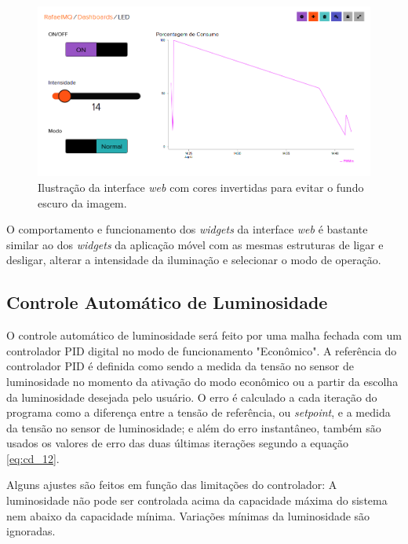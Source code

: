 \begin{figure}[ht]
    \begin{center}
    \includegraphics[width=\textwidth]{figuras/adaio.PNG}
    \end{center}
    \caption[Ilustração da interface \textit{web}.]{Ilustração da interface \textit{web} com cores invertidas para evitar o fundo escuro da imagem.}
    \label{adaio}
\end{figure}

O comportamento e funcionamento dos \textit{widgets} da interface \textit{web} é bastante similar ao dos \textit{widgets} da aplicação móvel com as mesmas estruturas de ligar e desligar, alterar a intensidade da iluminação e selecionar o modo de operação.

\subsection{Controle Automático de Luminosidade}

O controle automático de luminosidade será feito por uma malha fechada com um controlador PID digital no modo de funcionamento "Econômico". A referência do controlador \acf{PID} é definida como sendo a medida da tensão no sensor de luminosidade no momento da ativação do modo econômico ou a partir da escolha da luminosidade desejada pelo usuário. O erro é calculado a cada iteração do programa como a diferença entre a tensão de referência, ou \textit{setpoint}, e a  medida da tensão no sensor de luminosidade; e além do erro instantâneo, também são usados os valores de erro das duas últimas iterações segundo a equação \ref{eq:cd_12}.

Alguns ajustes são feitos em função das limitações do controlador: A luminosidade não pode ser controlada acima da capacidade máxima do sistema nem abaixo da capacidade mínima. Variações mínimas da luminosidade são ignoradas.


